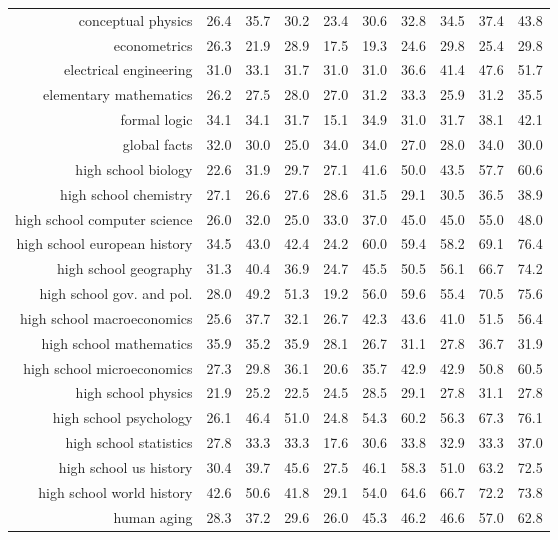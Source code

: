 \documentclass[10pt]{article} \usepackage[preprint]{tmlr}
\begin{document}
\begin{table*}
{\begin{tabular}{r ccc ccc ccc}
conceptual physics	&	26.4	&	35.7	&	30.2	&	23.4	&	30.6	&	32.8	&	34.5	&	37.4	&	43.8	\\
econometrics	&	26.3	&	21.9	&	28.9	&	17.5	&	19.3	&	24.6	&	29.8	&	25.4	&	29.8	\\
electrical engineering	&	31.0	&	33.1	&	31.7	&	31.0	&	31.0	&	36.6	&	41.4	&	47.6	&	51.7	\\
elementary mathematics	&	26.2	&	27.5	&	28.0	&	27.0	&	31.2	&	33.3	&	25.9	&	31.2	&	35.5	\\
formal logic	&	34.1	&	34.1	&	31.7	&	15.1	&	34.9	&	31.0	&	31.7	&	38.1	&	42.1	\\
global facts	&	32.0	&	30.0	&	25.0	&	34.0	&	34.0	&	27.0	&	28.0	&	34.0	&	30.0	\\
high school biology	&	22.6	&	31.9	&	29.7	&	27.1	&	41.6	&	50.0	&	43.5	&	57.7	&	60.6	\\
high school chemistry	&	27.1	&	26.6	&	27.6	&	28.6	&	31.5	&	29.1	&	30.5	&	36.5	&	38.9	\\
high school computer science	&	26.0	&	32.0	&	25.0	&	33.0	&	37.0	&	45.0	&	45.0	&	55.0	&	48.0	\\
high school european history	&	34.5	&	43.0	&	42.4	&	24.2	&	60.0	&	59.4	&	58.2	&	69.1	&	76.4	\\
high school geography	&	31.3	&	40.4	&	36.9	&	24.7	&	45.5	&	50.5	&	56.1	&	66.7	&	74.2	\\
high school gov. and pol.	&	28.0	&	49.2	&	51.3	&	19.2	&	56.0	&	59.6	&	55.4	&	70.5	&	75.6	\\
high school macroeconomics	&	25.6	&	37.7	&	32.1	&	26.7	&	42.3	&	43.6	&	41.0	&	51.5	&	56.4	\\
high school mathematics	&	35.9	&	35.2	&	35.9	&	28.1	&	26.7	&	31.1	&	27.8	&	36.7	&	31.9	\\
high school microeconomics	&	27.3	&	29.8	&	36.1	&	20.6	&	35.7	&	42.9	&	42.9	&	50.8	&	60.5	\\
high school physics	&	21.9	&	25.2	&	22.5	&	24.5	&	28.5	&	29.1	&	27.8	&	31.1	&	27.8	\\
high school psychology	&	26.1	&	46.4	&	51.0	&	24.8	&	54.3	&	60.2	&	56.3	&	67.3	&	76.1	\\
high school statistics	&	27.8	&	33.3	&	33.3	&	17.6	&	30.6	&	33.8	&	32.9	&	33.3	&	37.0	\\
high school us history	&	30.4	&	39.7	&	45.6	&	27.5	&	46.1	&	58.3	&	51.0	&	63.2	&	72.5	\\
high school world history	&	42.6	&	50.6	&	41.8	&	29.1	&	54.0	&	64.6	&	66.7	&	72.2	&	73.8	\\
human aging	&	28.3	&	37.2	&	29.6	&	26.0	&	45.3	&	46.2	&	46.6	&	57.0	&	62.8	\\

\end{tabular}}
\end{table*}
\end{document}
